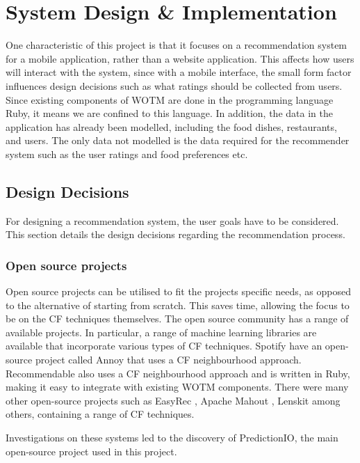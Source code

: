 \chapter{System Design \& Implementation}\label{C:work_done}

One characteristic of this project is that it focuses on a recommendation system for a mobile application, rather than a website application. This affects how users will interact with the system, since with a mobile interface, the small form factor influences design decisions such as what ratings should be collected from users. Since existing components of WOTM are done in the programming language Ruby, it means we are confined to this language. In addition, the data in the application has already been modelled, including the food dishes, restaurants, and users. The only data not modelled is the data required for the recommender system such as the user ratings and food preferences etc.   

\section{Design Decisions}

For designing a recommendation system, the user goals have to be considered. This section details the design decisions regarding the recommendation process.

\subsection{Open source projects}

Open source projects can be utilised to fit the projects specific needs, as opposed to the alternative of starting from scratch. This saves time, allowing the focus to be on the CF techniques themselves. The open source community has a range of available projects. In particular, a range of machine learning libraries are available that incorporate various types of CF techniques. Spotify \cite{annoy} have an open-source project called Annoy \cite{annoy} that uses a CF neighbourhood approach. Recommendable \cite{recommendable} also uses a CF neighbourhood approach and is written in Ruby, making it easy to integrate with existing WOTM components. There were many other open-source projects such as EasyRec \cite{easyrec}, Apache Mahout \cite{mahoutaction}, Lenskit \cite{lenskit} among others, containing a range of CF techniques. 

Investigations on these systems led to the discovery of PredictionIO, the main open-source project used in this project.

